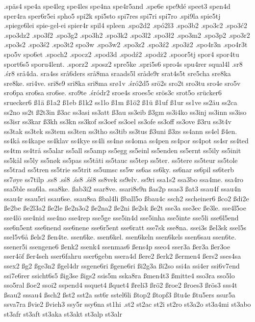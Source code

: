 {{.späs4
spe4a
spe4leg
spe4les
spe4na
spe4r5and
.spe6e
spe9dé
speet3
spen4d
sper4ra
sper6r5ei
spho5
spi2k
spi5sto
spi7res
spi7ri
spi7ro
.spi9la
spie5tj
.spiege6lei
spie-gel-ei
spier4r
spil4
spleen
.spo2d2
.spó2ł3
.spo3b2
.spo3c2
.spo3ć2
.spo3dz2
.spo3f2
.spo3g2
.spo3h2
.spo3k2
.spo3l2
.spo3ł2
.spo3m2
.spo3p2
.spo3r2
.spo3s2
.spo3ś2
.spo3t2
spo3w
.spo3w2
.spo3z2
.spo3ź2
.spo3ż2
.spo4r3n
.spo4r3t
spo5v
spo6et
.spoch2
.spocz2
.spod3d
.spodź2
.spodż2
.spoor5tj
spor4
spor4tu
sport6s5
sporu4lent.
.sporz2
.sposz2
spre5ke
.spri5s6
spro4s
spu4rer
squal4l
.sr8
.śr8
srå4da.
sra4ss
srå6ders
srå8ma
sraads5l
sråde9r
srat4s5t
sre5cha
sre8ka
sre8ke.
sri4ve.
sri8e9
sri8ka
sri8ma
srø1v
.śró2d5
srö2s
sro2t
sro3tu
sro4e
sro5v
sro6pa
sro6sa
sro6se.
sro9te
.śródr2
sroe4s
sroes5c
srös3c
srot5o
srücker6
sruecker6
ß1ä
ß1a2
ß1eb
ß1k2
ss1lo
ß1m
ß1ö2
ß1ü
ß1uf
ß1ur
ss1ve
ss2äu
ss2ca
ss2no
ss2t
ß2t3in
ß3ac
ss3asi
ss3att
ß3au
ss3eib
ß3gm
ss3i4ko
ss3inj
ss3inn
ss3iso
ss3isr
ss3kar
ß3kh
ss3kn
ss3kof
ss3oef
ss3oel
ss3ofe
ss3off
ss3ove
ß3ru
ss3t4v
ss3tak
ss3tek
ss3tem
ss3ten
ss3tho
ss3tib
ss3tus
ß3uni
ß3zs
ss4ann
ss4el
ß4en.
ss4kå
ss4kape
ss4klav
ss4kye
ss4li
ss4nø
ss4oma
ss4pen
ss4por
ss4pot
ss4sr
ss4ted
ss4tm
ss4trå
ss5alar
ss5all
ss5amp
ss5egg
ss5einl
ss5enden
ss5ernt
ss5ily
ss5init
ss5kål
ss5ly
ss5nøk
ss5pas
ss5täti
ss5tauc
ss5tep
ss5ter.
ss5tere
ss5teur
ss5tole
ss5trad
ss5tren
ss5trie
ss5trit
ss5umsc
ss5w
ss6as
ss6ky.
ss6nar
ss6pil
ss6terb
ss7øye
ss7tilp
.ss8
.sś8
.śs8
.śś8
ss8vek
ss9elv.
ss9ri
ssa1s2
ssa3bo
ssa4me.
ssa4ro
ssa5ble
ssa6la.
ssa8ke.
ßab3i2
ssar8ve.
ssari8e9n
ßas2p
ssas3
ßat3
ssau4f
ssau4n
ssau4r
ssau5ri
ssau6se.
ssau8sa
ßbal4li
ßball5o
ßbau4c
ssch2
sscheiner6
ßco2
ßdi2e
ße2be
ße2l3a2
ße2le
ße2n3o2
ße2na2
ße2ni
ße2sk
ße2t
sse3a
sse3ec
ße3le.
sse4l5oe
sse4lö
sse4nid
sse4no
sse4rep
sse5ge
sse5in4d
sse5inha
sse5inte
sse5li
sse6l5end
sse6n5ent
sse6nend
sse6nene
sse6r5ent
sse6ratt
sse7sk
sse8na.
ssei3s
ßel3sk
ssel5s
ssel5v6å
ßels2
ßen4te.
ssen6ke.
ssen6kel.
ssen6keln
ssen6kels
ssen6sau
ssen6te.
ssener5i
ssengene6
ßenk2
ssenk4
ssenmas6
ßens4p
sseo4
sser3a
ßer3a
ßer3oe
sser4öf
ßer4seh
sser6fahru
sser6gebn
ssera4d
ßere2
ßerk2
ßermen4
ßers2
sses4sa
ssex2
ßg2
ßge3n2
ßgel4dr
ssgene6ri
ßgene6ri
ßi2g3a
ßi2so
ssi4a
ssi4er
ssi6v7end
ssi7e6rer
ssicht6s5
ßig3se
ßigs2
ssis5m
sska8ra
ßmen4t3
ßmitte4
sso3ra
sso5lo
sso5ral
ßoe2
ssoi2
sspend4
ssquet4
ßquet4
ßreli3
ßrö2
ßroe2
ßroes3
ßrös3
sss4t
ßsau2
sssau4
ßsch2
ßst2
sst2a
sst6r
sstel6li
ßtop2
ßtopf3
ßtu4e
ßtu5ers
ssur5a
ssva7ra
ßvie2
ßvieh3
ssy5r
ssy6na
st1hi
.st2
st2ac
st2i
st2ro
st3a2o
st3a4mi
st3abo
st3afr
st3aft
st3aka
st3akt
st3alp
st3alr
}}

